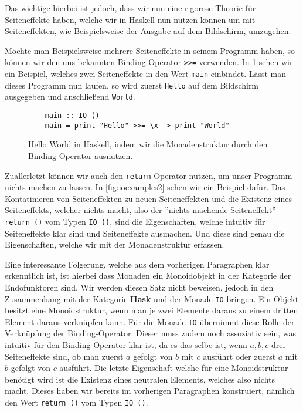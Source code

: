 \documentclass{hhuarticle}
\theoremstyle{definition}
\theoremstyle{theorem}
\begin{document}
  Das wichtige hierbei ist jedoch, dass wir nun eine rigorose Theorie
  für Seiteneffekte haben, welche wir in Haskell nun nutzen können
  um mit Seiteneffekten, wie Beispielsweise der Ausgabe auf dem Bildschirm,
  umzugehen.

  Möchte man Beispielsweise mehrere Seiteneffekte in seinem Programm
  haben, so können wir den uns bekannten Binding-Operator \verb|>>=|
  verwenden. In \cref{fig:ioexamples} sehen wir ein Beispiel, welches zwei
  Seiteneffekte in den Wert \verb|main| einbindet. Lässt man dieses
  Programm nun laufen, so wird zuerst \verb|Hello| auf dem Bildschirm
  ausgegeben und anschließend \verb|World|.
  
  \begin{figure}[h]
    \begin{lstlisting}
    main :: IO ()
    main = print "Hello" >>= \x -> print "World"
    \end{lstlisting}
    \caption{Hello World in Haskell, indem wir die Monadenstruktur durch den Binding-Operator ausnutzen.}%
    \label{fig:ioexamples}
  \end{figure}

  Zuallerletzt können wir auch den \verb|return| Operator nutzen, um
  unser Programm nichts machen zu lassen. In \cref{fig:ioexamples2} sehen
  wir ein Beispiel dafür. Das Kontatinieren von Seiteneffekten 
  zu neuen Seiteneffekten und die Existenz eines Seiteneffekts,
  welcher nichts macht, also der ''nichts-machende Seiteneffekt'' \verb|return ()|
  vom Typen \verb|IO ()|, sind die Eigenschaften, welche
  intuitiv für Seiteneffekte klar sind und Seiteneffekte ausmachen.
  Und diese sind genau die Eigenschaften, welche wir mit der Monadenstruktur
  erfassen.

  Eine interessante Folgerung, welche aus dem vorherigen Paragraphen
  klar erkenntlich ist, ist hierbei dass Monaden ein Monoidobjekt
  in der Kategorie der Endofunktoren sind. Wir werden diesen Satz nicht
  beweisen, jedoch in den Zusammenhang mit der Kategorie \textbf{Hask}
  und der Monade \verb|IO| bringen.
  Ein Objekt besitzt eine Monoidstruktur,
  wenn man je zwei Elemente daraus zu einem dritten Element daraus
  verknüpfen kann.
  Für die Monade \verb|IO| übernimmt diese Rolle der Verknüpfung der Binding-Operator.
  Dieser muss zudem noch assoziativ sein, was intuitiv für den Binding-Operator
  klar ist, da es das selbe ist, wenn $a, b, c$ drei Seiteneffekte sind,
  ob man zuerst $a$ gefolgt von $b$ mit $c$ ausführt oder zuerst $a$ mit $b$
  gefolgt von $c$ ausführt. Die letzte Eigenschaft welche für eine Monoidstruktur
  benötigt wird ist die Existenz eines neutralen Elements, welches
  also nichts macht. Dieses haben wir bereits im vorherigen Paragraphen
  konstruiert, nämlich den Wert \verb|return ()| vom Typen \verb|IO ()|.
\end{document}
